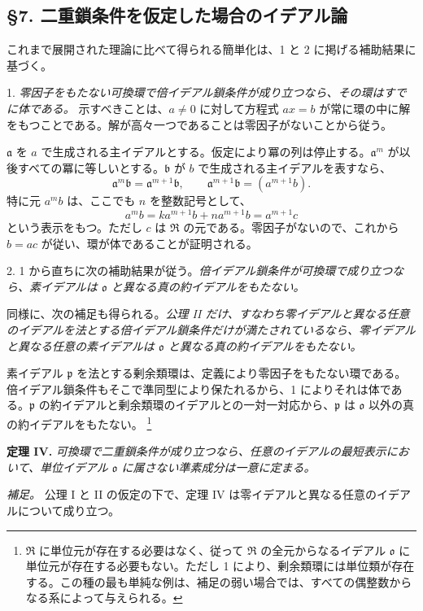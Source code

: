 \documentclass[11pt]{article}
\providecommand{\mR}{\mathfrak{R}}
\providecommand{\ma}{\mathfrak{a}}
\providecommand{\mb}{\mathfrak{b}}
\providecommand{\mo}{\mathfrak{o}}
\providecommand{\mpideal}{\mathfrak{p}}
\begin{document}
\subsection*{§7. 二重鎖条件を仮定した場合のイデアル論}

これまで展開された理論に比べて得られる簡単化は、1 と 2 に掲げる補助結果に基づく。

1. \emph{零因子をもたない可換環で倍イデアル鎖条件が成り立つなら、その環はすでに体である。} 示すべきことは、$a\ne0$ に対して方程式 $ax=b$ が常に環の中に解をもつことである。解が高々一つであることは零因子がないことから従う。

$\ma$ を $a$ で生成される主イデアルとする。仮定により冪の列は停止する。$\ma^m$ が以後すべての冪に等しいとする。$\mb$ が $b$ で生成される主イデアルを表すなら、
\[
        \ma^m\mb=\ma^{m+1}\mb,
        \qquad \ma^{m+1}\mb=(a^{m+1}b).
\]
特に元 $a^m b$ は、ここでも $n$ を整数記号として、
\[
        a^m b=k a^{m+1}b+n a^{m+1}b=a^{m+1}c
\]
という表示をもつ。ただし $c$ は $\mR$ の元である。零因子がないので、これから $b=ac$ が従い、環が体であることが証明される。

2. 1 から直ちに次の補助結果が従う。\emph{倍イデアル鎖条件が可換環で成り立つなら、素イデアルは $\mo$ と異なる真の約イデアルをもたない。}

同様に、次の補足も得られる。\emph{公理 II だけ、すなわち零イデアルと異なる任意のイデアルを法とする倍イデアル鎖条件だけが満たされているなら、零イデアルと異なる任意の素イデアルは $\mo$ と異なる真の約イデアルをもたない。}

素イデアル $\mpideal$ を法とする剰余類環は、定義により零因子をもたない環である。倍イデアル鎖条件もそこで準同型により保たれるから、1 によりそれは体である。$\mpideal$ の約イデアルと剰余類環のイデアルとの一対一対応から、$\mpideal$ は $\mo$ 以外の真の約イデアルをもたない。
\footnote{$\mR$ に単位元が存在する必要はなく、従って $\mR$ の全元からなるイデアル $\mo$ に単位元が存在する必要もない。ただし 1 により、剰余類環には単位類が存在する。この種の最も単純な例は、補足の弱い場合では、すべての偶整数からなる系によって与えられる。}

\textbf{定理 IV.} \emph{可換環で二重鎖条件が成り立つなら、任意のイデアルの最短表示において、単位イデアル $\mo$ に属さない準素成分は一意に定まる。}

\emph{補足。} 公理 I と II の仮定の下で、定理 IV は零イデアルと異なる任意のイデアルについて成り立つ。
\end{document}
